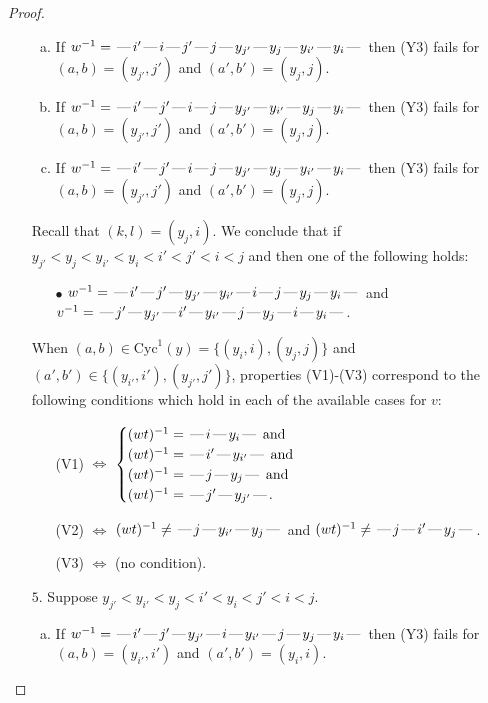 \documentclass[10pt]{article}
\theoremstyle{definition}
\theoremstyle{definition}
\def\dash{\text{\hspace{0.5mm}---\hspace{0.5mm}}}
\def\Cyc{\mathrm{Cyc}}
\begin{document}
\begin{proof}
\begin{enumerate}
\begin{enumerate}[(a)]
\item If $w^{-1} = \dash i'\dash i\dash j'\dash j\dash y_{j'}\dash y_j\dash y_{i'}\dash y_i\dash $ then (Y3) fails for $(a,b)=(y_{j'},j')$ and $(a',b')=(y_j,j)$.
\item If $w^{-1} = \dash i'\dash j'\dash i\dash j\dash y_{j'}\dash y_{i'}\dash y_j\dash y_i\dash $ then (Y3) fails for $(a,b)=(y_{j'},j')$ and $(a',b')=(y_j,j)$.
\item If $w^{-1} = \dash i'\dash j'\dash i\dash j\dash y_{j'}\dash y_j\dash y_{i'}\dash y_i\dash $ then (Y3) fails for $(a,b)=(y_{j'},j')$ and $(a',b')=(y_j,j)$.
\end{enumerate}
Recall that $(k,l) = (y_j,i)$.
We conclude that if $y_{j'} < y_j < y_{i'} < y_i < i' < j' < i < j$ and then one of the following holds:
\begin{enumerate}
\item[$\bullet$] $w^{-1} = \dash i'\dash j'\dash y_{j'}\dash y_{i'}\dash i\dash j\dash y_j\dash y_i\dash $ and $v^{-1} = \dash j'\dash y_{j'}\dash i'\dash y_{i'}\dash j\dash y_j\dash i\dash y_i\dash $.
\end{enumerate}
When $(a,b)\in\Cyc^1(y)=\{(y_i,i),(y_j,j)\}$ and $(a',b')\in\{(y_{i'},i'),(y_{j'},j')\}$,
properties (V1)-(V3) correspond to the following conditions which hold in
each of the available cases for $v$:
\begin{enumerate}
\item[](V1) $\Leftrightarrow$ $\begin{cases}\text{$(wt)^{-1} = \dash i \dash y_i \dash$}\text{ and }\\
\text{$(wt)^{-1} = \dash i' \dash y_{i'} \dash$}\text{ and }\\
\text{$(wt)^{-1} = \dash j \dash y_j \dash$}\text{ and }\\
\text{$(wt)^{-1} = \dash j' \dash y_{j'} \dash$}.\end{cases}$
\item[](V2) $\Leftrightarrow$ $(wt)^{-1} \neq \dash j \dash y_{i'} \dash y_j \dash$ and $(wt)^{-1}\neq \dash j \dash i' \dash y_j \dash$.
\item[](V3) $\Leftrightarrow$ (no condition).
\end{enumerate}
\item[$5$.] Suppose $y_{j'} < y_{i'} < y_j < i' < y_i < j' < i < j$.
\begin{enumerate}[(a)]
\item If $w^{-1} = \dash i'\dash j'\dash y_{j'}\dash i\dash y_{i'}\dash j\dash y_j\dash y_i\dash $ then (Y3) fails for $(a,b)=(y_{i'},i')$ and $(a',b')=(y_i,i)$.

\end{enumerate}
\end{enumerate}
\end{proof}
\end{document}

